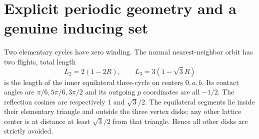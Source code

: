 \section{Explicit periodic geometry and a genuine inducing set}
Two elementary cycles have zero winding. The normal nearest-neighbor orbit has two flights, total length
\begin{equation}\label{eq:two-three}
 L_2=2(1-2R),\qquad
 L_3=3(1-\sqrt3 R)
\end{equation}
is the length of the inner equilateral three-cycle on centers $0,a,b$. Its contact angles are $\pi/6,5\pi/6,3\pi/2$ and its outgoing $p$ coordinates are all $-1/2$. The reflection cosines are respectively $1$ and $\sqrt3/2$. The equilateral segments lie inside their elementary triangle and outside the three vertex disks; any other lattice center is at distance at least $\sqrt3/2$ from that triangle. Hence all other disks are strictly avoided.

